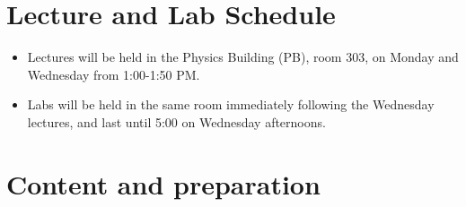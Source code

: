 \documentclass{revtex4}
\begin{document}
\section{Lecture and Lab Schedule}

\begin{itemize}
\item
Lectures will be held in the Physics Building (PB), room 303,
on Monday and Wednesday from 1:00-1:50 PM.
\item
Labs will be held in the same room immediately following the
Wednesday lectures, and last until 5:00 on Wednesday afternoons.
\end{itemize}

\section{Content and preparation}
\end{document}
